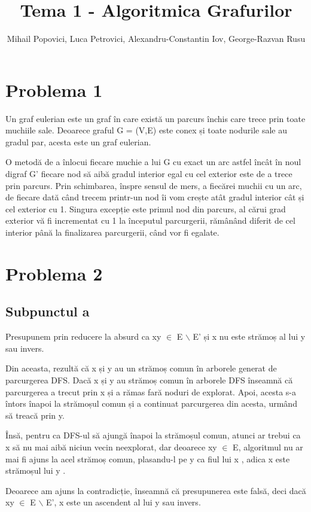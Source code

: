 \documentclass{article}
\title{Tema 1 - Algoritmica Grafurilor}
\author{Mihail Popovici, Luca Petrovici, Alexandru-Constantin Iov, George-Razvan Rusu}
\begin{document}
\maketitle

\section*{\fontsize{20}{50}\selectfont Problema 1}
{\fontsize{14}{16}\selectfont  Un graf eulerian este un graf în care există un parcurs închis care trece prin toate muchiile sale. Deoarece graful G = (V,E) este conex și toate nodurile sale au gradul par, acesta este un graf eulerian. 
\par O metodă de a înlocui fiecare muchie a lui G cu exact un arc astfel încât în noul digraf G' fiecare nod să aibă gradul interior egal cu cel exterior este de a trece prin parcurs. Prin schimbarea, înspre sensul de mers, a fiecărei muchii cu un arc, de fiecare dată când trecem printr-un nod îi vom crește atât gradul interior cât și cel exterior cu 1. Singura excepție este primul nod din parcurs, al cărui grad exterior vă fi incrementat cu 1 la începutul parcurgerii, rămânând diferit de cel interior până la finalizarea parcurgerii, când vor fi egalate.}

\section*{\fontsize{20}{50}\selectfont Problema 2}
\subsection*{\fontsize{16}{30}\selectfont Subpunctul a}
{\fontsize{14}{16}\selectfont  Presupunem prin reducere la absurd ca xy $\in$  E $\backslash$ E' și x nu este strămoș al lui y sau invers. 
\par Din aceasta, rezultă că x și y au un strămoș comun în arborele generat de parcurgerea DFS. Dacă x și y au strămoș comun în arborele DFS înseamnă că parcurgerea a trecut prin x și a rămas fară noduri de explorat. Apoi, acesta s-a întors înapoi la strămoșul comun și a continuat parcurgerea din acesta, urmând să treacă prin y. 
\par Însă, pentru ca DFS-ul să ajungă înapoi la strămoșul comun, atunci ar trebui ca x să nu mai aibă niciun vecin neexplorat, dar deoarece xy $\in$ E, algoritmul nu ar mai fi ajuns la acel strămoș comun, plasandu-l pe y ca fiul lui x , adica x este strămoșul lui y .
\par Deoarece am ajuns la contradicție, înseamnă că presupunerea este falsă, deci dacă xy $\in$ E $\backslash$ E', x este un ascendent al lui y sau invers. }
\end{document}
